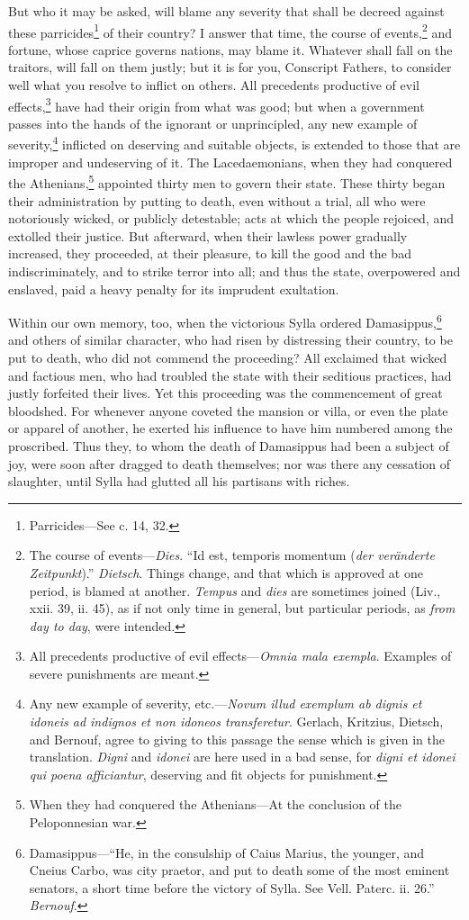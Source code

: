 But who it may be asked, will blame any severity that shall be
decreed against these parricides\footnote{Parricides—See c. 14, 32.} of their country? I answer that
time, the course of events,\footnote{The course of events—\emph{Dies}. ``Id est, temporis momentum
(\emph{der veränderte Zeitpunkt}).'' \emph{Dietsch}. Things change, and that
which is approved at one period, is blamed at another. \emph{Tempus} and
\emph{dies} are sometimes joined (Liv., xxii. 39, ii. 45), as if not only
time in general, but particular periods, as \emph{from day to day}, were
intended.} and fortune, whose caprice governs
nations, may blame it. Whatever shall fall on the traitors, will fall
on them justly; but it is for you, Conscript Fathers, to consider well
what you resolve to inflict on others. All precedents productive of
evil effects,\footnote{All precedents productive of evil effects—\emph{Omnia mala exempla}.
Examples of severe punishments are meant.} have had their origin from what was good; but when
a government passes into the hands of the ignorant or unprincipled,
any new example of severity,\footnote{Any new example of severity, etc.—\emph{Novum illud exemplum ab
dignis et idoneis ad indignos et non idoneos transferetur}. Gerlach,
Kritzius, Dietsch, and Bernouf, agree to giving to this passage the
sense which is given in the translation. \emph{Digni} and \emph{idonei} are
here used in a bad sense, for \emph{digni et idonei qui poena afficiantur},
deserving and fit objects for punishment.} inflicted on deserving and suitable
objects, is extended to those that are improper and undeserving of it.
The Lacedaemonians, when they had conquered the Athenians,\footnote{When they had conquered the Athenians—At the conclusion of
the Peloponnesian war.}
appointed thirty men to govern their state. These thirty began their
administration by putting to death, even without a trial, all who were
notoriously wicked, or publicly detestable; acts at which the people
rejoiced, and extolled their justice. But afterward, when their
lawless power gradually increased, they proceeded, at their pleasure,
to kill the good and the bad indiscriminately, and to strike terror
into all; and thus the state, overpowered and enslaved, paid a heavy
penalty for its imprudent exultation.

Within our own memory, too, when the victorious Sylla ordered
Damasippus,\footnote{Damasippus—``He, in the consulship of Caius Marius, the younger,
and Cneius Carbo, was city praetor, and put to death some of the most
eminent senators, a short time before the victory of Sylla. See Vell.
Paterc. ii. 26.'' \emph{Bernouf}.} and others of similar character, who had risen by
distressing their country, to be put to death, who did not commend the
proceeding? All exclaimed that wicked and factious men, who had
troubled the state with their seditious practices, had justly
forfeited their lives. Yet this proceeding was the commencement of
great bloodshed. For whenever anyone coveted the mansion or villa, or
even the plate or apparel of another, he exerted his influence to have
him numbered among the proscribed. Thus they, to whom the death of
Damasippus had been a subject of joy, were soon after dragged to death
themselves; nor was there any cessation of slaughter, until Sylla had
glutted all his partisans with riches.

